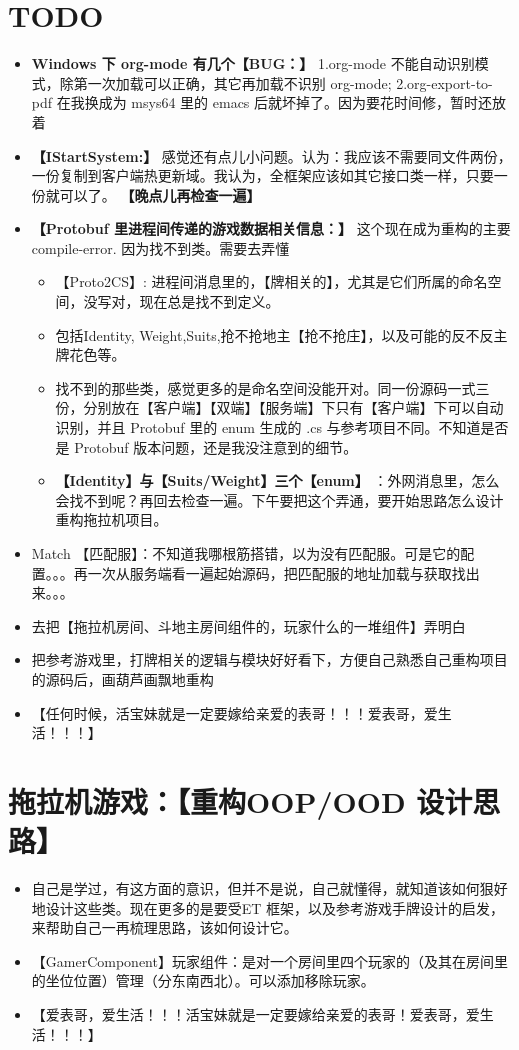 \documentclass[9pt, b5paper]{article}
\begin{document}
\section{{\bfseries\sffamily TODO} }
\label{sec-11}
\begin{itemize}
\item \textbf{Windows 下 org-mode 有几个【BUG：】} 1.org-mode 不能自动识别模式，除第一次加载可以正确，其它再加载不识别 org-mode; 2.org-export-to-pdf 在我换成为 msys64 里的 emacs 后就坏掉了。因为要花时间修，暂时还放着
\item \textbf{【IStartSystem:】} 感觉还有点儿小问题。认为：我应该不需要同文件两份，一份复制到客户端热更新域。我认为，全框架应该如其它接口类一样，只要一份就可以了。 \textbf{【晚点儿再检查一遍】}
\item \textbf{【Protobuf 里进程间传递的游戏数据相关信息：】} 这个现在成为重构的主要 compile-error. 因为找不到类。需要去弄懂
\begin{itemize}
\item 【Proto2CS】: 进程间消息里的，【牌相关的】，尤其是它们所属的命名空间，没写对，现在总是找不到定义。
\item 包括Identity, Weight,Suits,抢不抢地主【抢不抢庄】，以及可能的反不反主牌花色等。
\item 找不到的那些类，感觉更多的是命名空间没能开对。同一份源码一式三份，分别放在【客户端】【双端】【服务端】下只有【客户端】下可以自动识别，并且 Protobuf 里的 enum 生成的 .cs 与参考项目不同。不知道是否是 Protobuf 版本问题，还是我没注意到的细节。
\item \textbf{【Identity】与【Suits/Weight】三个【enum】} ：外网消息里，怎么会找不到呢？再回去检查一遍。下午要把这个弄通，要开始思路怎么设计重构拖拉机项目。
\end{itemize}
\item Match 【匹配服】：不知道我哪根筋搭错，以为没有匹配服。可是它的配置。。。再一次从服务端看一遍起始源码，把匹配服的地址加载与获取找出来。。。
\item 去把【拖拉机房间、斗地主房间组件的，玩家什么的一堆组件】弄明白
\item 把参考游戏里，打牌相关的逻辑与模块好好看下，方便自己熟悉自己重构项目的源码后，画葫芦画飘地重构
\item 【任何时候，活宝妹就是一定要嫁给亲爱的表哥！！！爱表哥，爱生活！！！】
\end{itemize}


\section{拖拉机游戏：【重构OOP/OOD 设计思路】}
\label{sec-12}
\begin{itemize}
\item 自己是学过，有这方面的意识，但并不是说，自己就懂得，就知道该如何狠好地设计这些类。现在更多的是要受ET 框架，以及参考游戏手牌设计的启发，来帮助自己一再梳理思路，该如何设计它。
\item 【GamerComponent】玩家组件：是对一个房间里四个玩家的（及其在房间里的坐位位置）管理（分东南西北）。可以添加移除玩家。
\item 【爱表哥，爱生活！！！活宝妹就是一定要嫁给亲爱的表哥！爱表哥，爱生活！！！】
\end{itemize}
\end{document}
